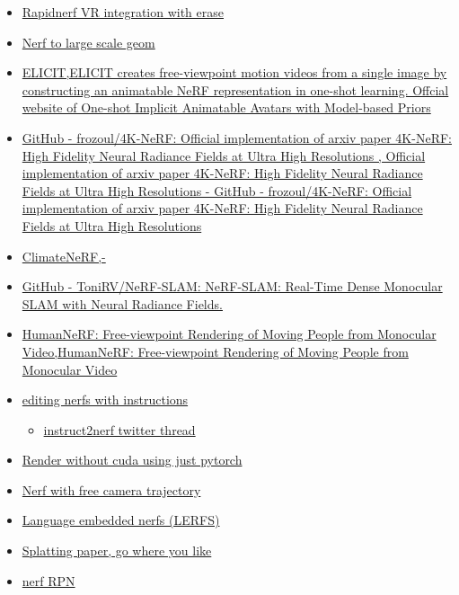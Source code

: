 \begin{itemize}
\begin{itemize}
{    integration}
  \item
    \href{https://github.com/NVlabs/instant-ngp\#vr-controls}{Rapidnerf
    VR integration with erase}
  \item
    \href{https://bakedsdf.github.io/}{Nerf to large scale geom}
  \item
    \href{https://elicit3d.github.io/}{ELICIT,ELICIT creates
    free-viewpoint motion videos from a single image by constructing an
    animatable NeRF representation in one-shot learning. Offcial website
    of \textquotesingle One-shot Implicit Animatable Avatars with
    Model-based Priors\textquotesingle{}}
  \item
    \href{https://github.com/frozoul/4k-nerf}{GitHub - frozoul/4K-NeRF:
    Official implementation of arxiv paper 4K-NeRF: High Fidelity Neural
    Radiance Fields at Ultra High Resolutions , Official implementation
    of arxiv paper 4K-NeRF: High Fidelity Neural Radiance Fields at
    Ultra High Resolutions - GitHub - frozoul/4K-NeRF: Official
    implementation of arxiv paper 4K-NeRF: High Fidelity Neural Radiance
    Fields at Ultra High Resolutions}
  \item
    \href{https://climatenerf.github.io/}{ClimateNeRF,-}
  \item
    \href{https://github.com/tonirv/nerf-slam}{GitHub -
    ToniRV/NeRF-SLAM: NeRF-SLAM: Real-Time Dense Monocular SLAM with
    Neural Radiance Fields.}
  \item
    \href{https://grail.cs.washington.edu/projects/humannerf/}{HumanNeRF:
    Free-viewpoint Rendering of Moving People from Monocular
    Video,HumanNeRF: Free-viewpoint Rendering of Moving People from
    Monocular Video}
  \item
    \href{https://instruct-nerf2nerf.github.io/}{editing nerfs with
    instructions}

    \begin{itemize}
     
    \item
      \href{https://mobile.twitter.com/bilawalsidhu/status/1638919452392583169}{instruct2nerf
      twitter thread}
    \end{itemize}
  \item
    \href{https://github.com/taichi-dev/taichi-nerfs}{Render without
    cuda using just pytorch}
  \item
    \href{https://totoro97.github.io/projects/f2-nerf/}{Nerf with free
    camera trajectory}
  \item
    \href{https://www.lerf.io/}{Language embedded nerfs (LERFS)}
  \item
    \href{https://repo-sam.inria.fr/fungraph/3d-gaussian-splatting/}{Splatting
    paper, go where you like}
  \item
    \href{https://github.com/lyclyc52/NeRF_RPN}{nerf RPN}
  \end{itemize}
\end{itemize}


